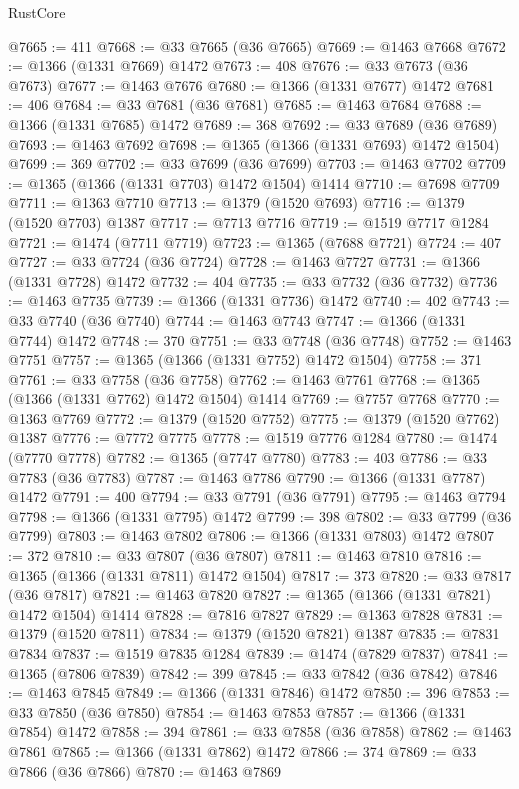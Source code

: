 \begin{lexlean}{RustCore}
\begin{coremodule}
@7665 := 411
@7668 := @33 @7665 (@36 @7665)
@7669 := @1463 @7668
@7672 := @1366 (@1331 @7669) @1472
@7673 := 408
@7676 := @33 @7673 (@36 @7673)
@7677 := @1463 @7676
@7680 := @1366 (@1331 @7677) @1472
@7681 := 406
@7684 := @33 @7681 (@36 @7681)
@7685 := @1463 @7684
@7688 := @1366 (@1331 @7685) @1472
@7689 := 368
@7692 := @33 @7689 (@36 @7689)
@7693 := @1463 @7692
@7698 := @1365 (@1366 (@1331 @7693) @1472 @1504)
@7699 := 369
@7702 := @33 @7699 (@36 @7699)
@7703 := @1463 @7702
@7709 := @1365 (@1366 (@1331 @7703) @1472 @1504) @1414
@7710 := @7698 @7709
@7711 := @1363 @7710
@7713 := @1379 (@1520 @7693)
@7716 := @1379 (@1520 @7703) @1387
@7717 := @7713 @7716
@7719 := @1519 @7717 @1284
@7721 := @1474 (@7711 @7719)
@7723 := @1365 (@7688 @7721)
@7724 := 407
@7727 := @33 @7724 (@36 @7724)
@7728 := @1463 @7727
@7731 := @1366 (@1331 @7728) @1472
@7732 := 404
@7735 := @33 @7732 (@36 @7732)
@7736 := @1463 @7735
@7739 := @1366 (@1331 @7736) @1472
@7740 := 402
@7743 := @33 @7740 (@36 @7740)
@7744 := @1463 @7743
@7747 := @1366 (@1331 @7744) @1472
@7748 := 370
@7751 := @33 @7748 (@36 @7748)
@7752 := @1463 @7751
@7757 := @1365 (@1366 (@1331 @7752) @1472 @1504)
@7758 := 371
@7761 := @33 @7758 (@36 @7758)
@7762 := @1463 @7761
@7768 := @1365 (@1366 (@1331 @7762) @1472 @1504) @1414
@7769 := @7757 @7768
@7770 := @1363 @7769
@7772 := @1379 (@1520 @7752)
@7775 := @1379 (@1520 @7762) @1387
@7776 := @7772 @7775
@7778 := @1519 @7776 @1284
@7780 := @1474 (@7770 @7778)
@7782 := @1365 (@7747 @7780)
@7783 := 403
@7786 := @33 @7783 (@36 @7783)
@7787 := @1463 @7786
@7790 := @1366 (@1331 @7787) @1472
@7791 := 400
@7794 := @33 @7791 (@36 @7791)
@7795 := @1463 @7794
@7798 := @1366 (@1331 @7795) @1472
@7799 := 398
@7802 := @33 @7799 (@36 @7799)
@7803 := @1463 @7802
@7806 := @1366 (@1331 @7803) @1472
@7807 := 372
@7810 := @33 @7807 (@36 @7807)
@7811 := @1463 @7810
@7816 := @1365 (@1366 (@1331 @7811) @1472 @1504)
@7817 := 373
@7820 := @33 @7817 (@36 @7817)
@7821 := @1463 @7820
@7827 := @1365 (@1366 (@1331 @7821) @1472 @1504) @1414
@7828 := @7816 @7827
@7829 := @1363 @7828
@7831 := @1379 (@1520 @7811)
@7834 := @1379 (@1520 @7821) @1387
@7835 := @7831 @7834
@7837 := @1519 @7835 @1284
@7839 := @1474 (@7829 @7837)
@7841 := @1365 (@7806 @7839)
@7842 := 399
@7845 := @33 @7842 (@36 @7842)
@7846 := @1463 @7845
@7849 := @1366 (@1331 @7846) @1472
@7850 := 396
@7853 := @33 @7850 (@36 @7850)
@7854 := @1463 @7853
@7857 := @1366 (@1331 @7854) @1472
@7858 := 394
@7861 := @33 @7858 (@36 @7858)
@7862 := @1463 @7861
@7865 := @1366 (@1331 @7862) @1472
@7866 := 374
@7869 := @33 @7866 (@36 @7866)
@7870 := @1463 @7869

\end{coremodule}
\end{lexlean}
